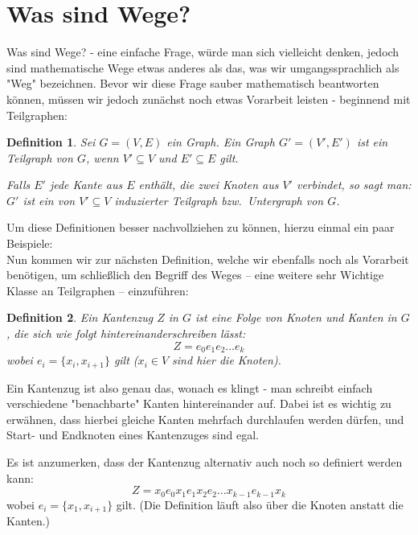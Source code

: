 \documentclass{article}
\newtheorem{definition}{Definition}
\begin{document}
\section{Was sind Wege?}
Was sind Wege? - eine einfache Frage, würde man sich vielleicht denken, jedoch sind mathematische Wege etwas anderes als das, was wir umgangssprachlich als "Weg" bezeichnen. Bevor wir diese Frage sauber mathematisch beantworten können, müssen wir jedoch zunächst noch etwas Vorarbeit leisten - beginnend mit Teilgraphen:\\
\begin{definition}
	Sei $G = (V, E)$ ein Graph. Ein Graph $G' = (V', E')$ ist ein \emph{Teilgraph} von $G$, wenn $V' \subseteq V$ und $E' \subseteq E$ gilt.
		\par\bigskip
	Falls $E'$ jede Kante aus $E$ enthält, die zwei Knoten aus $V'$ verbindet, so sagt man: $G'$ ist ein von $V' \subseteq V$ \emph{induzierter Teilgraph} bzw.\ \emph{Untergraph} von $G$.
\end{definition}
Um diese Definitionen besser nachvollziehen zu können, hierzu einmal ein paar Beispiele:\\
\bigskip
Nun kommen wir zur nächsten Definition, welche wir ebenfalls noch als Vorarbeit benötigen, um schließlich den Begriff des Weges -- eine weitere sehr Wichtige Klasse an Teilgraphen -- einzuführen:\\
\begin{definition}
	Ein \emph{Kantenzug $Z$} in $G$ ist eine Folge von Knoten und Kanten in $G$, die sich wie folgt hintereinanderschreiben lässt:
	 \begin{equation*}
		Z = e_0e_1e_2 \ldots e_k
	\end{equation*}
	 wobei $e_i = \{x_i, x_{i+1}\}$ gilt ($x_i \in V$ sind hier die Knoten).
\end{definition}
\bigskip
Ein Kantenzug ist also genau das, wonach es klingt - man schreibt einfach verschiedene "benachbarte" Kanten hintereinander auf. Dabei ist es wichtig zu erwähnen, dass hierbei gleiche Kanten mehrfach durchlaufen werden dürfen, und Start- und Endknoten eines Kantenzuges sind egal.\\
\begin{small}
	\begin{emph}
		Es ist anzumerken, dass der Kantenzug alternativ auch noch so definiert werden kann:\\
		\begin{equation*}
			Z = x_0e_0x_1e_1x_2e_2 \ldots x_{k-1}e_{k-1}x_k
		\end{equation*}
		wobei $e_i = \{x_1, x_{i+1}\}$ gilt. (Die Definition läuft also über die Knoten anstatt die Kanten.)
	\end{emph}
\end{small}
\end{document}
